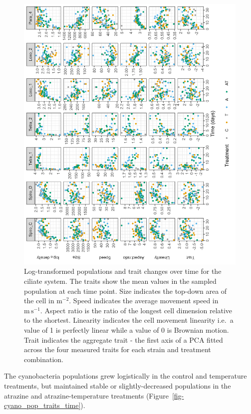 \documentclass[
  letterpaper,
  DIV=11,
  numbers=noendperiod]{scrartcl}
\begin{document}
\begin{figure}

{\centering \includegraphics[width=4.5in,height=\textheight]{figures/cilia/cilia_pop-traits-time.png}

}

\caption{\label{fig-cilia_pop_traits_time}Log-transformed populations
and trait changes over time for the ciliate system. The traits show the
mean values in the sampled population at each time point. Size indicates
the top-down area of the cell in \textmu\(\mathrm{m}^{-2}\). Speed
indicates the average movement speed in \textmu\(\mathrm{m \, s}^{-1}\).
Aspect ratio is the ratio of the longest cell dimension relative to the
shortest. Linearity indicates the cell movement linearity i.e.~a value
of 1 is perfectly linear while a value of 0 is Brownian motion. Trait
indicates the aggregate trait - the first axis of a PCA fitted across
the four measured traits for each strain and treatment combination.}

\end{figure}

The cyanobacteria populations grew logistically in the control and
temperature treatments, but maintained stable or slightly-decreased
populations in the atrazine and atrazine-temperature treatments
(Figure~\ref{fig-cyano_pop_traits_time}).
\end{document}

